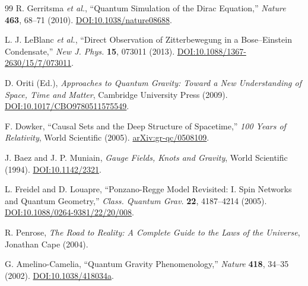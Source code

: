 \documentclass[%
 reprint,
 amsmath,amssymb,
 aps,
]{revtex4-1}
\numberwithin{equation}{section}%
\begin{document}
\begin{thebibliography}{99}
R. Gerritsma \textit{et al.},
``Quantum Simulation of the Dirac Equation,''
\textit{Nature} \textbf{463}, 68--71 (2010).
\href{https://doi.org/10.1038/nature08688}{DOI:10.1038/nature08688}.

L. J. LeBlanc \textit{et al.},
``Direct Observation of Zitterbewegung in a Bose--Einstein Condensate,''
\textit{New J. Phys.} \textbf{15}, 073011 (2013).
\href{https://doi.org/10.1088/1367-2630/15/7/073011}{DOI:10.1088/1367-2630/15/7/073011}.

D. Oriti (Ed.),
\textit{Approaches to Quantum Gravity: Toward a New Understanding of Space, Time and Matter},
Cambridge University Press (2009).
\href{https://doi.org/10.1017/CBO9780511575549}{DOI:10.1017/CBO9780511575549}.

F. Dowker,
``Causal Sets and the Deep Structure of Spacetime,''
\textit{100 Years of Relativity}, World Scientific (2005).
\href{https://arxiv.org/abs/gr-qc/0508109}{arXiv:gr-qc/0508109}.

J. Baez and J. P. Muniain,
\textit{Gauge Fields, Knots and Gravity},
World Scientific (1994).
\href{https://doi.org/10.1142/2321}{DOI:10.1142/2321}.

L. Freidel and D. Louapre,
``Ponzano-Regge Model Revisited: I. Spin Networks and Quantum Geometry,''
\textit{Class. Quantum Grav.} \textbf{22}, 4187--4214 (2005).
\href{https://doi.org/10.1088/0264-9381/22/20/008}{DOI:10.1088/0264-9381/22/20/008}.

R. Penrose,
\textit{The Road to Reality: A Complete Guide to the Laws of the Universe},
Jonathan Cape (2004).

G. Amelino-Camelia,
``Quantum Gravity Phenomenology,''
\textit{Nature} \textbf{418}, 34--35 (2002).
\href{https://doi.org/10.1038/418034a}{DOI:10.1038/418034a}.

\end{thebibliography}
\end{document}
